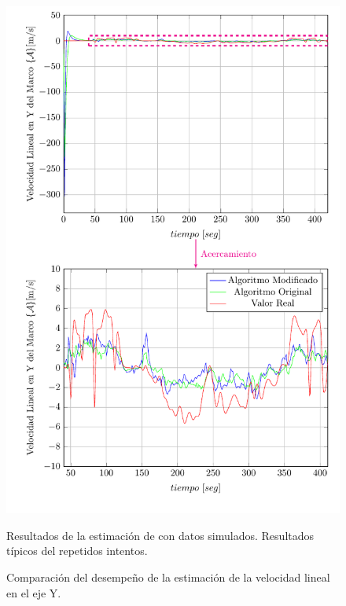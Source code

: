 \documentclass[10pt]{report}
\numberwithin{equation}{chapter}
\numberwithin{algorithm}{chapter}
\begin{document}
\begin{figure}
\begin{center}
\includegraphics[scale=0.8]
{PlotV.pdf}
\caption{Comparación del desempeño de la estimación de la velocidad lineal en el eje Y.}
\scriptsize{Resultados de la estimación de con datos simulados. Resultados típicos del repetidos intentos.}
\label{PlotV1}
\end{center}
\end{figure}
\end{document}
